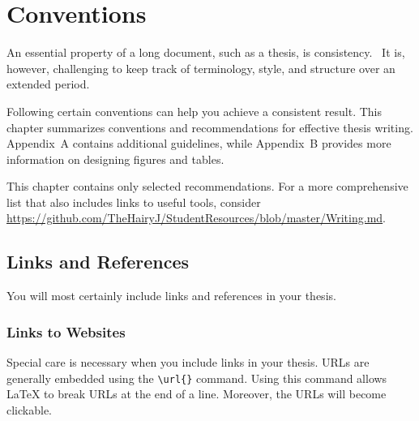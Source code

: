 \chapter{Conventions} %

\label{Chapter2} %


An essential property of a long document, such as a thesis, is consistency.%
\ 
It is, however, challenging to keep track of terminology, style, and structure over an extended period.

Following certain conventions can help you achieve a consistent result. This chapter summarizes conventions and recommendations for effective thesis writing.
Appendix~A contains additional guidelines, while Appendix~B provides more information on designing figures and tables.

This%
 chapter contains only selected recommendations. For a more comprehensive list that also includes links to useful tools, consider \url{https://github.com/TheHairyJ/StudentResources/blob/master/Writing.md}.

\section{Links and References}

You will most certainly include links and references in your thesis.

\subsection{Links to Websites}

Special care is necessary when you include links in your thesis. URLs are generally embedded using the \verb|\url{}| command. Using this command allows LaTeX to break URLs at the end of a line. Moreover, the URLs will become clickable.

